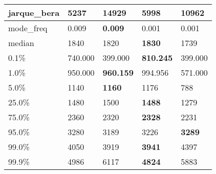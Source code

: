 \begin{table}[H]
\begin{tabular}{|l|m{10em}|m{10em}|m{10em}|m{10em}|}
\hline jarque\_bera & 5237 & \cellcolor[rgb]{0.9, 0.54, 0.52} 14929 & \bfseries 5998 & 10962 \\
\hline mode\_freq & 0.009 & \bfseries 0.009 & \cellcolor[rgb]{0.9, 0.54, 0.52} 0.001 & 0.001 \\
\hline median & 1840 & 1820 & \bfseries 1830 & \cellcolor[rgb]{0.9, 0.54, 0.52} 1739 \\
\hline 0.1\% & 740.000 & \cellcolor[rgb]{0.9, 0.54, 0.52} 399.000 & \bfseries 810.245 & \cellcolor[rgb]{0.9, 0.54, 0.52} 399.000 \\
\hline 1.0\% & 950.000 & \bfseries 960.159 & 994.956 & \cellcolor[rgb]{0.9, 0.54, 0.52} 571.000 \\
\hline 5.0\% & 1140 & \bfseries 1160 & 1176 & \cellcolor[rgb]{0.9, 0.54, 0.52} 788 \\
\hline 25.0\% & 1480 & 1500 & \bfseries 1488 & \cellcolor[rgb]{0.9, 0.54, 0.52} 1279 \\
\hline 75.0\% & 2360 & 2320 & \bfseries 2328 & \cellcolor[rgb]{0.9, 0.54, 0.52} 2231 \\
\hline 95.0\% & 3280 & \cellcolor[rgb]{0.9, 0.54, 0.52} 3189 & 3226 & \bfseries 3289 \\
\hline 99.0\% & 4050 & 3919 & \bfseries 3941 & \cellcolor[rgb]{0.9, 0.54, 0.52} 4397 \\
\hline 99.9\% & 4986 & \cellcolor[rgb]{0.9, 0.54, 0.52} 6117 & \bfseries 4824 & 5883 \\
\hline
\end{tabular}
\end{table}
